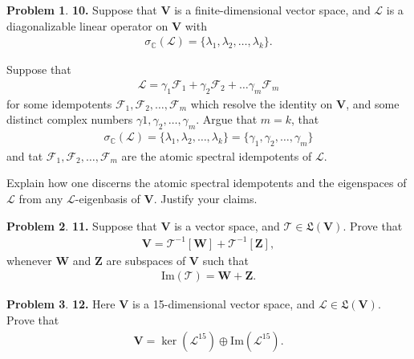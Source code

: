\documentclass{article}
\theoremstyle{definition}
\newtheorem*{prob*}{Problem}
\newcommand{\F}{\mathcal{F}}
\newcommand{\V}{\mathbf{V}}
\newcommand{\W}{\mathbf{W}}
\newcommand{\Z}{\mathbf{Z}}
\newcommand{\lag}{\mathcal{L}}
\newcommand{\ima}{\text{Im}}
\newcommand{\T}{\mathcal{T}}
\newcommand{\LL}{\mathfrak{L}}
\begin{document}
\begin{prob*}\textbf{10.} Suppose that $\V$ is a finite-dimensional vector space, and $\lag$ is a diagonalizable linear operator on $\V$ with
	\begin{align*}
	\sigma_\mathbb{C}(\lag) = \{ \lambda_1, \lambda_2, \dots ,  \lambda_k\}.
	\end{align*}
	
	
	\item Suppose that 
	\begin{align*}
	\lag = \gamma_1 \F_1 + \gamma_2 \F_2 + \dots \gamma_m \F_m
	\end{align*}
	for some idempotents $\F_1, \F_2, \dots, \F_m$ which resolve the identity on $\V$, and some distinct complex numbers $\gamma1, \gamma_2, \dots, \gamma_m$. Argue that $m=k$, that 
	\begin{align*}
	\sigma_\mathbb{C}(\lag) = \{ \lambda_1, \lambda_2, \dots, \lambda_k \} = \{ \gamma_1, \gamma_2, \dots, \gamma_m \}
	\end{align*} 
	and tat $\F_1, \F_2, \dots, \F_m$ are the atomic spectral idempotents of $\lag$.
	
	
	
	\item Explain how one discerns the atomic spectral idempotents and the eigenspaces of $\lag$ from any $\lag$-eigenbasis of $\V$. Justify your claims. 
\end{prob*}




\newpage



\begin{prob*}\textbf{11.} Suppose that $\V$ is a vector space, and $\T \in \LL(\V)$. Prove that 
	\begin{align*}
	\V = \T^{-1}[\W] + \T^{-1}[\Z],
	\end{align*}
	whenever $\W$ and $\Z$ are subspaces of $\V$ such that 
	\begin{align*}
	\ima(\T) = \W + \Z.
	\end{align*}
	
\end{prob*}



\newpage



\begin{prob*}\textbf{12.} Here $\V$ is a 15-dimensional vector space, and $\lag \in \LL(\V)$. Prove that 
	\begin{align*}
	\V = \ker(\lag^{15}) \oplus \ima(\lag^{15}).
	\end{align*}
\end{prob*}
\end{document}
